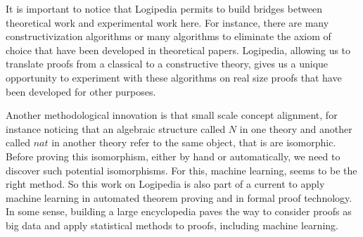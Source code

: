 It is important to notice that Logipedia permits to build bridges
between theoretical work and experimental work here. For instance,
there are many constructivization algorithms or many algorithms to
eliminate the axiom of choice that have been developed in theoretical
papers. Logipedia, allowing us to translate proofs from a classical to
a constructive theory, gives us a unique opportunity to experiment
with these algorithms on real size proofs that have been developed for
other purposes.

Another methodological innovation is that small scale concept
alignment, for instance noticing that an algebraic structure called
$N$ in one theory and another called $nat$ in another theory refer to
the same object, that is are isomorphic. Before proving this
isomorphism, either by hand or automatically, we need to discover such
potential isomorphisms. For this, machine learning, seems to be the
right method. So this work on Logipedia is also part of a current to
apply machine learning in automated theorem proving and in formal
proof technology. In some sense, building a large encyclopedia paves
the way to consider proofs as big data and apply statistical methods to 
proofs, including machine learning.

